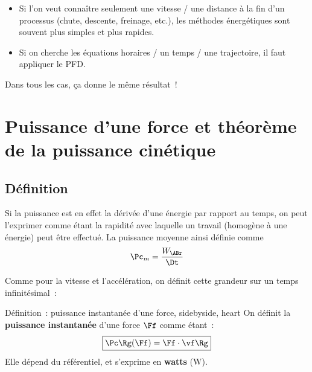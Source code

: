 \documentclass[../main/main.tex]{subfiles}
\begin{document}
\begin{itemize}
    \item Si l’on veut connaître seulement une vitesse / une distance à la fin
        d’un processus (chute, descente, freinage, etc.), les méthodes
        énergétiques sont souvent plus simples et plus rapides.

    \item Si on cherche les équations horaires / un temps / une trajectoire, il
        faut appliquer le PFD.
\end{itemize}

Dans tous les cas, ça donne le même résultat~!

\section{Puissance d'une force et théorème de la puissance cinétique}
\subsection{Définition}
Si la puissance est en effet la dérivée d'une énergie par rapport au temps, on
peut l'exprimer comme étant la rapidité avec laquelle un travail (homogène à une
énergie) peut être effectué. La puissance moyenne ainsi définie comme
\[\Pc_m = \frac{W_{\ABr}}{\Dt}\]

Comme pour la vitesse et l'accélération, on définit cette grandeur sur un temps
infinitésimal~:

\begin{tdefi}{Définition~: puissance instantanée d'une force, sidebyside, heart}
    On définit la \textbf{puissance instantanée} d'une force $\Ff$ comme étant~:
    \[\boxed{\Pc\Rg(\Ff) = \Ff\cdot\vf\Rg}\]
    \tcblower
    Elle dépend du référentiel, et s'exprime en \textbf{watts} (W).
\end{tdefi}
\end{document}
